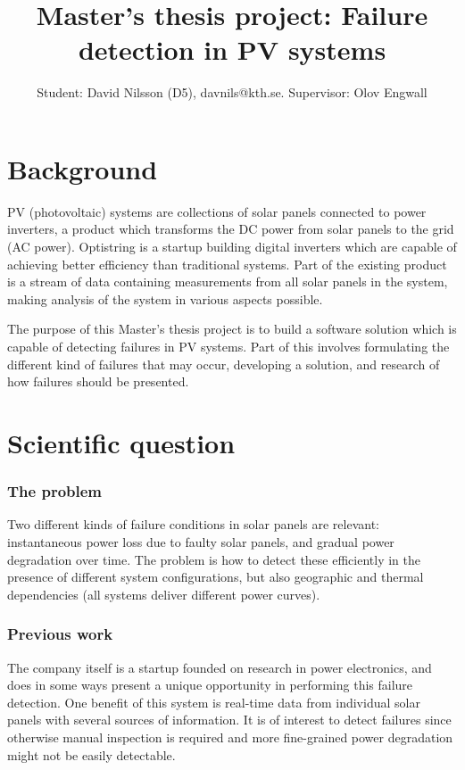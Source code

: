 \documentclass[a4paper,11pt]{article}
\title{Master's thesis project: Failure detection in PV systems}
\author{Student: David Nilsson (D5), davnils@kth.se. Supervisor: Olov Engwall}
\begin{document}
\maketitle

\section*{Background}
PV (photovoltaic) systems are collections of solar panels connected to power
inverters, a product which transforms the DC power from solar panels to the grid (AC power).
Optistring is a startup building digital inverters which are capable of achieving
better efficiency than traditional systems.
Part of the existing product is a stream of data containing measurements from all
solar panels in the system, making analysis of the system in various aspects possible.

The purpose of this Master's thesis project is to build a software solution which
is capable of detecting failures in PV systems.
Part of this involves formulating the different kind of failures that may occur,
developing a solution, and research of how failures should be presented.

\section*{Scientific question}

\subsubsection*{The problem}
Two different kinds of failure conditions in solar panels are relevant: instantaneous power loss due to faulty solar panels, and gradual power degradation over time.
The problem is how to detect these efficiently in the presence of different system configurations, but also geographic and thermal dependencies (all systems deliver different power curves). 

\subsubsection*{Previous work}
The company itself is a startup founded on research in power electronics, and does in some ways present a unique opportunity in performing this failure detection.
One benefit of this system is real-time data from individual solar panels with several sources of information.
It is of interest to detect failures since otherwise manual inspection is required and more fine-grained power degradation might not be easily detectable.
\end{document}
